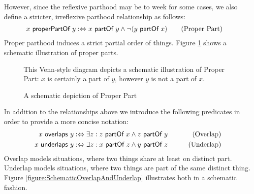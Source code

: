 However, since the reflexive parthood may be to week for some cases, we also define a stricter, irreflexive parthood relationship as follows:
\begin{align}
x ~\textsf{properPartOf}~ y
:\Leftrightarrow
x ~\textsf{partOf}~ y \wedge \neg(y ~\textsf{partOf}~ x)
&\qquad \text{(Proper Part)}
\label{definition:ProperPart}
\end{align}
Proper parthood induces a strict partial order of things.
Figure \ref{figure:SchematicProperPart} shows a schematic illustration of proper parts.

\begin{figure}[h!]
\begin{center}
\end{center}
{
\scriptsize 
This Venn-style diagram depicts a schematic illustration of Proper Part:
$x$ is certainly a part of $y$, however $y$ is not a part of $x$.
}
\caption{A schematic depiction of Proper Part}
\label{figure:SchematicProperPart}
\end{figure}


In addition to the relationships above we introduce the following predicates in order to provide a more concise notation:
\begin{align}
x ~\textsf{overlaps}~ y
&:\Leftrightarrow
\exists z : z ~\textsf{partOf}~ x \wedge z ~\textsf{partOf}~ y
&\qquad \text{(Overlap)}
\label{definition:Overlap}
\\
x ~\textsf{underlaps}~ y
&:\Leftrightarrow
\exists z : x ~\textsf{partOf}~ z \wedge y ~\textsf{partOf}~ z
&\qquad \text{(Underlap)}
\label{definition:Underlap}
\end{align}
Overlap models situations, where two things share at least on distinct part.
Underlap models situations, where two things are part of the same distinct thing.
Figure \ref{figure:SchematicOverlapAndUnderlap} illustrates both in a schematic fashion.

